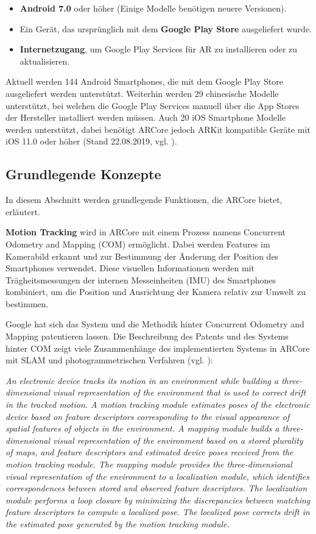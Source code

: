 \begin{itemize}
\item \textbf{Android 7.0} oder höher (Einige Modelle benötigen neuere Versionen).
\item Ein Gerät, das ursprünglich mit dem \textbf{Google Play Store} ausgeliefert wurde.
\item \textbf{Internetzugang}, um Google Play Services für AR zu installieren oder zu aktualisieren.
\end{itemize}

Aktuell werden 144 Android Smartphones, die mit dem Google Play Store ausgeliefert werden unterstützt. Weiterhin werden 29 chinesische Modelle unterstützt, bei welchen die Google Play Services manuell über die App Stores der Hersteller installiert werden müssen. Auch 20 iOS Smartphone Modelle werden unterstützt, dabei benötigt ARCore jedoch ARKit kompatible Geräte mit iOS 11.0 oder höher (Stand 22.08.2019, vgl. \cite{arcore_devices}).

\subsection{Grundlegende Konzepte}

In diesem Abschnitt werden grundlegende Funktionen, die ARCore bietet, erläutert.

\textbf{Motion Tracking} wird in ARCore mit einem Prozess namens \glqq Concurrent Odometry and Mapping\grqq{} (COM) ermöglicht. Dabei werden Features im Kamerabild erkannt und zur Bestimmung der Änderung der Position des Smartphones verwendet. Diese visuellen Informationen werden mit Trägheitsmessungen der internen Messeinheiten (IMU) des Smartphones kombiniert, um die Position und Ausrichtung der Kamera relativ zur Umwelt zu bestimmen.

Google hat sich das System und die Methodik hinter \glqq Concurrent Odometry and Mapping\grqq{} patentieren lassen. Die Beschreibung des Patents und des Systems hinter COM zeigt viele Zusammenhänge des implementierten Systems in ARCore mit SLAM und photogrammetrischen Verfahren (vgl. \cite{patent}): 

\glqq \textit{An electronic device tracks its motion in an environment while building a three-dimensional visual representation of the environment that is used to correct drift in the tracked motion. A motion tracking module estimates poses of the electronic device based on feature descriptors corresponding to the visual appearance of spatial features of objects in the environment. A mapping module builds a three-dimensional visual representation of the environment based on a stored plurality of maps, and feature descriptors and estimated device poses received from the motion tracking module. The mapping module provides the three-dimensional visual representation of the environment to a localization module, which identifies correspondences between stored and observed feature descriptors. The localization module performs a loop closure by minimizing the discrepancies between matching feature descriptors to compute a localized pose. The localized pose corrects drift in the estimated pose generated by the motion tracking module.}\grqq{}

